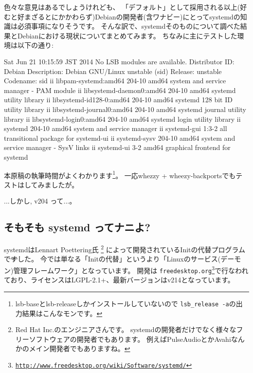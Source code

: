 \documentclass[mingoth,a4paper]{jsarticle}
\begin{document}
色々な意見はあるでしょうけれども、
「デフォルト」として採用される以上(好むと好まざるとにかかわらず)Debianの開発者(含ワナビー)にとってsystemdの知識は必須事項になりそうです。
そんな訳で、systemdそのものについて調べた結果とDebianにおける現状についてまとめてみます。%
ちなみに主にテストした環境は以下の通り:
\begin{commandline}
Sat Jun 21 10:15:59 JST 2014
No LSB modules are available.
Distributor ID: Debian
Description:    Debian GNU/Linux unstable (sid)
Release:        unstable
Codename:       sid
ii  libpam-systemd:amd64        204-10   amd64   system and service manager - PAM module
ii  libsystemd-daemon0:amd64    204-10   amd64   systemd utility library
ii  libsystemd-id128-0:amd64    204-10   amd64   systemd 128 bit ID utility library
ii  libsystemd-journal0:amd64   204-10   amd64   systemd journal utility library
ii  libsystemd-login0:amd64     204-10   amd64   systemd login utility library
ii  systemd                     204-10   amd64   system and service manager
ii  systemd-gui                 1:3-2    all     transitional package for systemd-ui
ii  systemd-sysv                204-10   amd64   system and service manager - SysV links
ii  systemd-ui                  3-2      amd64   graphical frontend for systemd
\end{commandline}
\noindent
本原稿の執筆時間がよくわかります\footnote{%
  lsb-baseとlsb-releaseしかインストールしていないので%
  \texttt{lsb\_release -a}の出力結果はこんなモンです。
}。
%
一応whezzy + wheezy-backportsでもテストはしてみましたが。

...しかし, v204 って...。

\subsection{そもそも systemd ってナニよ?}

systemdはLennart Poettering氏%
\footnote{Red Hat Inc.のエンジニアさんです。%
  systemdの開発者だけでなく様々なフリーソフトウェアの開発者でもあります。%
  例えばPulseAudioとかAvahiなんかのメイン開発者でもありますね。}%
によって開発されているInitの代替プログラムで\sout{す}した。
今では単なる「Initの代替」というより「Linuxのサービス(デーモン)管理フレームワーク」となっています。
開発は
\texttt{freedesktop.org}\footnote{%
  \href{http://www.freedesktop.org/wiki/Software/systemd/}{\texttt{http://www.freedesktop.org/wiki/Software/systemd/}}%
}で行なわれており、ライセンスはLGPL-2.1+、最新バージョンはv214となっています。
\end{document}
